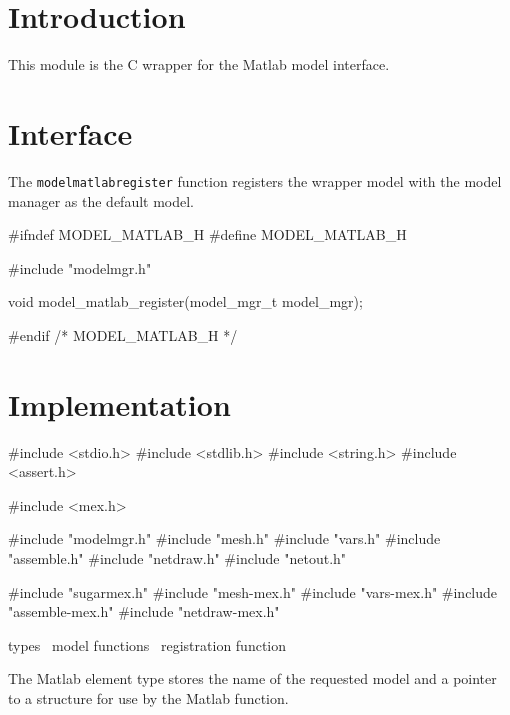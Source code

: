 
\section{Introduction}

This module is the C wrapper for the Matlab model interface.


\section{Interface}

The {\tt{}model{}matlab{}register} function registers the wrapper model with
the model manager as the default model.

\endmoddef
#ifndef MODEL_MATLAB_H
#define MODEL_MATLAB_H

#include "modelmgr.h"

void model_matlab_register(model_mgr_t model_mgr);

#endif /* MODEL_MATLAB_H */
\nwendcode{}\nwdocspar


\section{Implementation}

\nwenddocs{}\endmoddef
#include <stdio.h>
#include <stdlib.h>
#include <string.h>
#include <assert.h>

#include <mex.h>

#include "modelmgr.h"
#include "mesh.h"
#include "vars.h"
#include "assemble.h"
#include "netdraw.h"
#include "netout.h"

#include "sugarmex.h"
#include "mesh-mex.h"
#include "vars-mex.h"
#include "assemble-mex.h"
#include "netdraw-mex.h"

\LA{}types~{\nwtagstyle{}}\RA{}
\LA{}model functions~{\nwtagstyle{}}\RA{}
\LA{}registration function~{\nwtagstyle{}}\RA{}
\nwendcode{}\nwdocspar

The Matlab element type stores the name of the requested model
and a pointer to a structure for use by the Matlab function.

